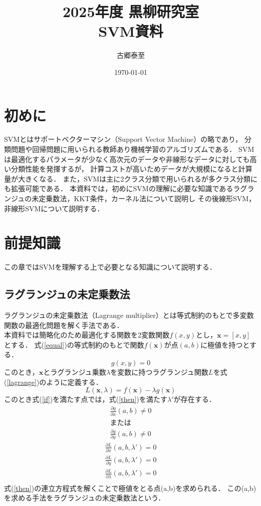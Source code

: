 \documentclass[11pt,a4paper,titlepage]{ltjsarticle}
\title{2025年度 黒柳研究室\\SVM資料}
\author{古郷泰至}
\date{\today}
\begin{document}
\maketitle
%
%
\section{初めに}
SVMとはサポートベクターマシン（Support Vector Machine）の略であり，
分類問題や回帰問題に用いられる教師あり機械学習のアルゴリズムである．
SVMは最適化するパラメータが少なく高次元のデータや非線形なデータに対しても高い分類性能を発揮するが，
計算コストが高いためデータが大規模になると計算量が大きくなる\cite{masaya8028}．
また，SVMは主に2クラス分類で用いられるが多クラス分類にも拡張可能である．
本資料では，初めにSVMの理解に必要な知識であるラグランジュの未定乗数法，KKT条件，カーネル法について説明し
その後線形SVM，非線形SVMについて説明する．
\section{前提知識}
この章ではSVMを理解する上で必要となる知識について説明する．
\subsection{ラグランジュの未定乗数法}
ラグランジュの未定乗数法（Lagrange multiplier）とは等式制約のもとで多変数関数の最適化問題を解く手法である．\\
本資料では簡略化のため最適化する関数を2変数関数$f(x,y)$とし，$\bm{x} = [x,y]$とする．
式(\ref{equal})の等式制約のもとで関数$f(\bm{x})$が点$(a,b)$に極値を持つとする．
\begin{equation}
    \label{equal}
    g(x,y) = 0
\end{equation}
このとき，$\bm{x}$とラグランジュ乗数$\lambda$を変数に持つラグランジュ関数$L$を式(\ref{lagrange})のように定義する．
\begin{equation}
    \label{lagrange}
    L(\bm{x},\lambda) = f(\bm{x}) - \lambda g(\bm{x})
\end{equation}
このとき式(\ref{if})を満たす点では，式(\ref{then})を満たす$\lambda '$が存在する\cite{lagrange}．
\begin{equation}
    \label{if}
    \begin{aligned}
        \frac{\partial g}{\partial x}(a,b) \ne 0 \\
        または \\
        \frac{\partial g}{\partial y}(a,b) \ne 0
    \end{aligned}
\end{equation}
\begin{equation}
    \label{then}
    \begin{aligned}
        \frac{\partial L}{\partial x}(a,b,\lambda ') = 0\\
        \frac{\partial L}{\partial y}(a,b,\lambda ') = 0\\
        \frac{\partial L}{\partial \lambda}(a,b,\lambda ') = 0\\
    \end{aligned}
\end{equation}
式(\ref{then})の連立方程式を解くことで極値をとる点(a,b)を求められる．
この(a,b)を求める手法をラグランジュの未定乗数法という\cite{lagrange}．
\end{document}
